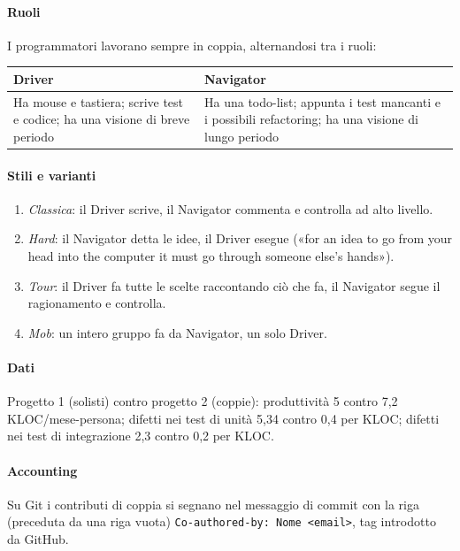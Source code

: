 \documentclass[a4paper,12pt]{article}
\begin{document}
\paragraph{Ruoli} I programmatori lavorano sempre in coppia, alternandosi tra i ruoli:
\begin{center}
\begin{tabular}{|p{7.2cm}|p{7.2cm}|}
\hline
\textbf{Driver} & \textbf{Navigator}\\
\hline
Ha mouse e tastiera; scrive test e codice; ha una visione di breve periodo &
Ha una todo-list; appunta i test mancanti e i possibili refactoring; ha una visione di
lungo periodo\\
\hline
\end{tabular}
\end{center}

\paragraph{Stili e varianti}
\begin{enumerate}[nosep]
  \item \emph{Classica}: il Driver scrive, il Navigator commenta e controlla ad alto livello.
  \item \emph{Hard}: il Navigator detta le idee, il Driver esegue («for an idea to go from
        your head into the computer it must go through someone else's hands»).
  \item \emph{Tour}: il Driver fa tutte le scelte raccontando ciò che fa, il Navigator
        segue il ragionamento e controlla.
  \item \emph{Mob}: un intero gruppo fa da Navigator, un solo Driver.
\end{enumerate}

\paragraph{Dati} Progetto 1 (solisti) contro progetto 2 (coppie): produttività 5 contro 7,2
KLOC/mese-persona; difetti nei test di unità 5,34 contro 0,4 per KLOC; difetti nei test di
integrazione 2,3 contro 0,2 per KLOC.

\paragraph{Accounting} Su Git i contributi di coppia si segnano nel messaggio di commit
con la riga (preceduta da una riga vuota) \texttt{Co-authored-by: Nome <email>}, tag
introdotto da GitHub.
\end{document}
